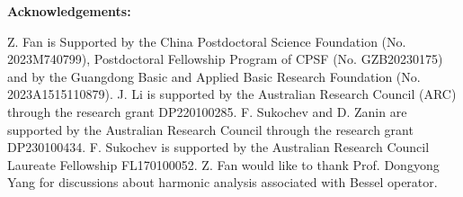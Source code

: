 \documentclass{amsart}
\begin{document}
{\bf Acknowledgements:}


Z. Fan is Supported by the China Postdoctoral Science Foundation (No. 2023M740799), Postdoctoral Fellowship Program of CPSF (No. GZB20230175) and by the Guangdong Basic and Applied Basic Research Foundation (No. 2023A1515110879). J. Li is supported by the Australian Research Council (ARC) through the research grant DP220100285. F. Sukochev and D. Zanin are supported by the Australian Research Council through the research grant DP230100434. F. Sukochev is supported by the Australian Research Council Laureate Fellowship FL170100052. Z. Fan would like to thank Prof. Dongyong Yang for discussions about harmonic analysis associated with Bessel operator.



\end{document}
